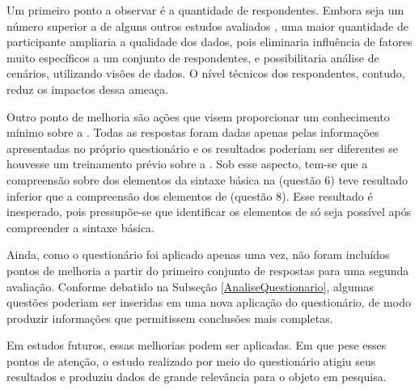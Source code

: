 Um primeiro ponto a observar é a quantidade de respondentes. Embora seja um
número superior a de alguns outros estudos avaliados
\cite{albuquerque2015quantifying}
\cite{hernandes2010avaliaccao} \cite{laitenberger1998evaluating}, uma maior
quantidade de participante ampliaria a qualidade dos dados, pois eliminaria influência de fatores muito
específicos a um conjunto de respondentes, e possibilitaria análise de 
cenários, utilizando visões de dados. O nível técnicos dos respondentes,
contudo, reduz os impactos dessa ameaça.

Outro ponto de melhoria são ações que visem proporcionar um conhecimento mínimo
sobre a \neoidl{}. Todas as respostas foram dadas apenas pelas informações
apresentadas no próprio questionário e os resultados poderiam ser diferentes se
houvesse um treinamento prévio sobre a \neoidl{}. Sob esse aspecto, tem-se que a
compreensão sobre dos elementos da sintaxe básica na \neoidl{} (questão 6) teve
resultado inferior que a compreensão dos elementos de \designbycontract{}
(questão 8). Esse resultado é inesperado, pois pressupõe-se que identificar os
elementos de \designbycontract{} só seja possível após compreender a sintaxe
básica.

Ainda, como o questionário foi aplicado apenas uma vez, não foram incluídos
pontos de melhoria a partir do primeiro conjunto de respostas para uma segunda
avaliação. Conforme debatido na Subseção \ref{AnaliseQuestionario}, algumas
questões poderiam ser inseridas em uma nova aplicação do questionário, de
modo produzir informações que permitissem conclusões mais completas.

Em estudos futuros, essas melhorias podem ser aplicadas. Em que pese esses
pontos de atenção, o estudo realizado por meio do questionário atigiu seus
resultados e produziu dados de grande relevância para o objeto em pesquisa.
